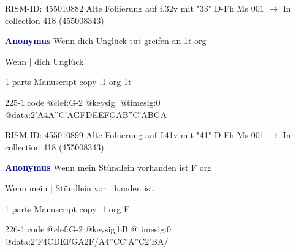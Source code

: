 \documentclass[twocolumn]{book}
\begin{document}
\newline RISM-ID: 455010882
\newline Alte Foliierung auf f.32v mit "33"
\newline D-Fh  Ms 001
\newline $\rightarrow$ In collection 418 (455008343)

\newline \par \vspace{7pt} \textcolor{darkblue}{\textbf{Anonymus  }}
\newline Wenn dich Unglück tut greifen an  1t  
\newline org
\newline \begin{itshape}[f.41v, at left:] Wenn | dich Unglück\end{itshape} 
\newline \textcolor{darkblue}{}  1 parts  
\newline Manuscript copy
.1  org  1t  
\begin{filecontents*}{225-1.code}
@clef:G-2
@keysig:
@timesig:0
@data:2'A4A''C'AGFDEEFGAB''C'ABGA
\end{filecontents*}
\newline
%

\newline RISM-ID: 455010899
\newline Alte Foliierung auf f.41v mit "41"
\newline D-Fh  Ms 001
\newline $\rightarrow$ In collection 418 (455008343)

\newline \par \vspace{7pt} \textcolor{darkblue}{\textbf{Anonymus  }}
\newline Wenn mein Stündlein vorhanden ist  F  
\newline org
\newline \begin{itshape}[f.28v, at left:] Wenn mein | Stündlein vor | handen ist.\end{itshape} 
\newline \textcolor{darkblue}{}  1 parts  
\newline Manuscript copy
.1  org  F  
\begin{filecontents*}{226-1.code}
@clef:G-2
@keysig:bB
@timesig:0
@data:2'F4CDEFGA2F/A4''CC'A''C2'BA/
\end{filecontents*}
\newline
%
\end{document}

